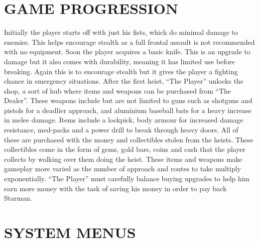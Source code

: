 \documentclass{article}
\begin{document}
\section{GAME PROGRESSION \label{progression}}
Initially the player starts off with just his fists, which do minimal damage to enemies. This helps encourage stealth as a full frontal assault is not recommended with no equipment. Soon the player acquires a basic knife. This is an upgrade to damage but it also comes with durability, meaning it has limited use before breaking. Again this is to encourage stealth but it gives the player a fighting chance in emergency situations.
\bigbreak
After the first heist, “The Player” unlocks the shop, a sort of hub where items and weapons can be purchased from “The Dealer”. These weapons include but are not limited to guns such as shotguns and pistols for a deadlier approach, and aluminium baseball bats for a heavy increase in melee damage.
\bigbreak
Items include a lockpick, body armour for increased damage resistance, med-packs and a power drill to break through heavy doors.
 \bigbreak
All of these are purchased with the money and collectibles stolen from the heists. These collectibles come in the form of gems, gold bars, coins and cash that the player collects by walking over them doing the heist.
\bigbreak
These items and weapons make gameplay more varied as the number of approach and routes to take multiply exponentially. “The Player” must carefully balance buying upgrades to help him earn more money with the task of saving his money in order to pay back Starman.

\section{SYSTEM MENUS \label{menus}}
\end{document}
